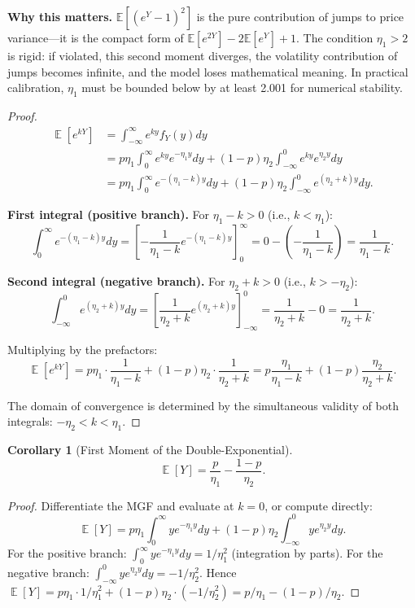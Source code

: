 \documentclass[11pt,a4paper,openany]{book}
\theoremstyle{definition}
\theoremstyle{plain}
\newtheorem{corollary}[theorem]{Corollary}
\theoremstyle{remark}
\DeclareMathOperator{\E}{\mathbb{E}}
\newcommand{\1}{\mathbbm{1}}
\begin{document}
\medskip
\noindent\textbf{Why this matters.} $\mathbb{E}[(e^Y - 1)^2]$ is the pure contribution of jumps to price variance---it is the compact form of $\mathbb{E}[e^{2Y}] - 2\mathbb{E}[e^Y] + 1$. The condition $\eta_1 > 2$ is rigid: if violated, this second moment diverges, the volatility contribution of jumps becomes infinite, and the model loses mathematical meaning. In practical calibration, $\eta_1$ must be bounded below by at least 2.001 for numerical stability.

\begin{proof}
\[
\begin{aligned}
\E[e^{kY}] &= \int_{-\infty}^{\infty} e^{ky} f_{Y}(y) dy \\
&= p \eta_{1} \int_{0}^{\infty} e^{ky} e^{-\eta_{1} y} dy + (1-p) \eta_{2} \int_{-\infty}^{0} e^{ky} e^{\eta_{2} y} dy \\
&= p \eta_{1} \int_{0}^{\infty} e^{-(\eta_{1} - k) y} dy + (1-p) \eta_{2} \int_{-\infty}^{0} e^{(\eta_{2} + k) y} dy.
\end{aligned}
\]

\textbf{First integral (positive branch).} For $\eta_{1} - k > 0$ (i.e., $k < \eta_{1}$):
\[
\int_{0}^{\infty} e^{-(\eta_{1} - k) y} dy = \left[-\frac{1}{\eta_{1} - k} e^{-(\eta_{1} - k) y}\right]_{0}^{\infty} = 0 - \left(-\frac{1}{\eta_{1} - k}\right) = \frac{1}{\eta_{1} - k}.
\]

\textbf{Second integral (negative branch).} For $\eta_{2} + k > 0$ (i.e., $k > -\eta_{2}$):
\[
\int_{-\infty}^{0} e^{(\eta_{2} + k) y} dy = \left[\frac{1}{\eta_{2} + k} e^{(\eta_{2} + k) y}\right]_{-\infty}^{0} = \frac{1}{\eta_{2} + k} - 0 = \frac{1}{\eta_{2} + k}.
\]

Multiplying by the prefactors:
\[
\E[e^{kY}] = p \eta_{1} \cdot \frac{1}{\eta_{1} - k} + (1-p) \eta_{2} \cdot \frac{1}{\eta_{2} + k} = p \frac{\eta_{1}}{\eta_{1} - k} + (1-p) \frac{\eta_{2}}{\eta_{2} + k}.
\]

The domain of convergence is determined by the simultaneous validity of both integrals: $-\eta_{2} < k < \eta_{1}$.
\end{proof}

\begin{corollary}[First Moment of the Double-Exponential]
\[
\E[Y] = \frac{p}{\eta_{1}} - \frac{1-p}{\eta_{2}}.
\]
\end{corollary}

\begin{proof}
Differentiate the MGF and evaluate at $k = 0$, or compute directly:
\[
\E[Y] = p \eta_{1} \int_{0}^{\infty} y e^{-\eta_{1} y} dy + (1-p) \eta_{2} \int_{-\infty}^{0} y e^{\eta_{2} y} dy.
\]
For the positive branch: $\int_{0}^{\infty} y e^{-\eta_{1} y} dy = 1/\eta_{1}^{2}$ (integration by parts). For the negative branch: $\int_{-\infty}^{0} y e^{\eta_{2} y} dy = -1/\eta_{2}^{2}$. Hence $\E[Y] = p \eta_{1} \cdot 1/\eta_{1}^{2} + (1-p) \eta_{2} \cdot (-1/\eta_{2}^{2}) = p/\eta_{1} - (1-p)/\eta_{2}$.
\end{proof}
\end{document}
